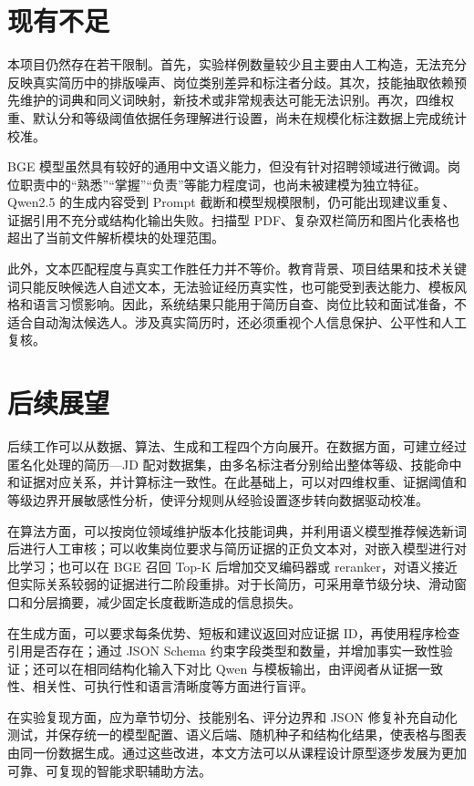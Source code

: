 \documentclass[UTF8,zihao=-4,a4paper,oneside]{ctexrep}
\begin{document}
\section{现有不足}


本项目仍然存在若干限制。首先，实验样例数量较少且主要由人工构造，无法充分反映真实简历中的排版噪声、岗位类别差异和标注者分歧。其次，技能抽取依赖预先维护的词典和同义词映射，新技术或非常规表达可能无法识别。再次，四维权重、默认分和等级阈值依据任务理解进行设置，尚未在规模化标注数据上完成统计校准。


BGE 模型虽然具有较好的通用中文语义能力，但没有针对招聘领域进行微调。岗位职责中的“熟悉”“掌握”“负责”等能力程度词，也尚未被建模为独立特征。Qwen2.5 的生成内容受到 Prompt 截断和模型规模限制，仍可能出现建议重复、证据引用不充分或结构化输出失败。扫描型 PDF、复杂双栏简历和图片化表格也超出了当前文件解析模块的处理范围。


此外，文本匹配程度与真实工作胜任力并不等价。教育背景、项目结果和技术关键词只能反映候选人自述文本，无法验证经历真实性，也可能受到表达能力、模板风格和语言习惯影响。因此，系统结果只能用于简历自查、岗位比较和面试准备，不适合自动淘汰候选人。涉及真实简历时，还必须重视个人信息保护、公平性和人工复核。


\section{后续展望}


后续工作可以从数据、算法、生成和工程四个方向展开。在数据方面，可建立经过匿名化处理的简历—JD 配对数据集，由多名标注者分别给出整体等级、技能命中和证据对应关系，并计算标注一致性。在此基础上，可以对四维权重、证据阈值和等级边界开展敏感性分析，使评分规则从经验设置逐步转向数据驱动校准。


在算法方面，可以按岗位领域维护版本化技能词典，并利用语义模型推荐候选新词后进行人工审核；可以收集岗位要求与简历证据的正负文本对，对嵌入模型进行对比学习；也可以在 BGE 召回 Top-K 后增加交叉编码器或 reranker，对语义接近但实际关系较弱的证据进行二阶段重排。对于长简历，可采用章节级分块、滑动窗口和分层摘要，减少固定长度截断造成的信息损失。


在生成方面，可以要求每条优势、短板和建议返回对应证据 ID，再使用程序检查引用是否存在；通过 JSON Schema 约束字段类型和数量，并增加事实一致性验证；还可以在相同结构化输入下对比 Qwen 与模板输出，由评阅者从证据一致性、相关性、可执行性和语言清晰度等方面进行盲评。


在实验复现方面，应为章节切分、技能别名、评分边界和 JSON 修复补充自动化测试，并保存统一的模型配置、语义后端、随机种子和结构化结果，使表格与图表由同一份数据生成。通过这些改进，本文方法可以从课程设计原型逐步发展为更加可靠、可复现的智能求职辅助方法。
\end{document}
